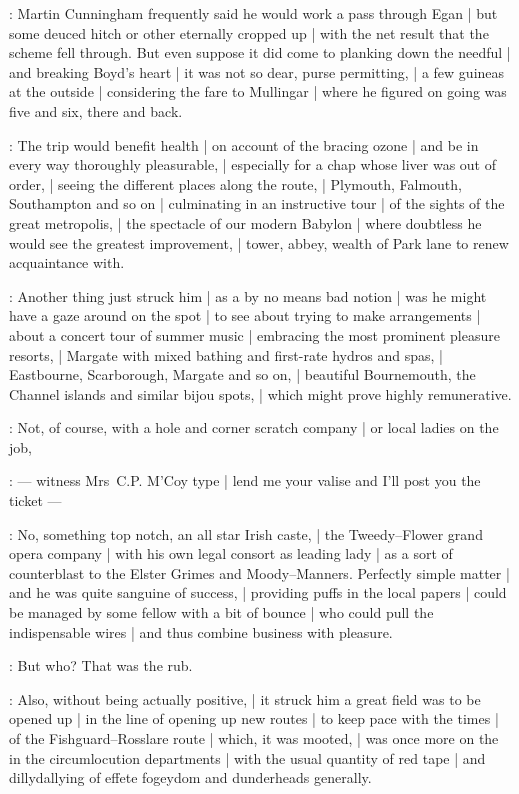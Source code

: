 :
Martin Cunningham frequently said he would work a pass through Egan |
but some deuced hitch or other eternally cropped up |
with the net result that the scheme fell through.
But even suppose it did come to planking down the needful |
and breaking Boyd's heart |
it was not so dear, purse permitting, |
a few guineas at the outside |
considering the fare to Mullingar |
where he figured on going was five and six, there and back.

:
The trip would benefit health |
on account of the bracing ozone |
and be in every way thoroughly pleasurable, |
especially for a chap whose liver was out of order, |
seeing the different places along the route, |
Plymouth, Falmouth, Southampton and so on |
culminating in an instructive tour |
of the sights of the great metropolis, |
the spectacle of our modern Babylon |
where doubtless he would see the greatest improvement, |
tower, abbey, wealth of Park lane to renew acquaintance with.

:
Another thing just struck him |
as a by no means bad notion |
was he might have a gaze around on the spot |
to see about trying to make arrangements |
about a concert tour of summer music |
embracing the most prominent pleasure resorts, |
Margate with mixed bathing and first-rate hydros and spas, |
Eastbourne, Scarborough, Margate and so on, |
beautiful Bournemouth, the Channel islands and similar bijou spots, |
which might prove highly remunerative.

:
Not, of course, with a hole and corner scratch company |
or local ladies on the job,

:
    --- witness Mrs~C.P. M'Coy type |
        lend me your valise and I'll post you the ticket ---

:
No, something top notch, an all star Irish caste, |
the Tweedy--Flower grand opera company |
with his own legal consort as leading lady |
as a sort of counterblast to the Elster Grimes and Moody--Manners.
Perfectly simple matter |
and he was quite sanguine of success, |
providing puffs in the local papers |
could be managed by some fellow with a bit of bounce |
who could pull the indispensable wires |
and thus combine business with pleasure.

:
But who?
That was the rub.

:
Also, without being actually positive, |
it struck him a great field was to be opened up |
in the line of opening up new routes |
to keep pace with the times |
 of the Fishguard--Rosslare route |
which, it was mooted, |
was once more on the  in the circumlocution departments |
with the usual quantity of red tape |
and dillydallying of effete fogeydom and dunderheads generally.

